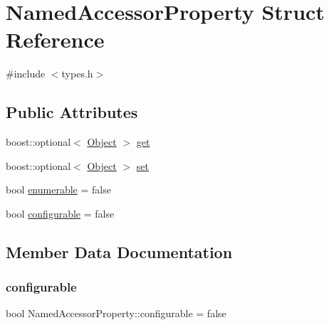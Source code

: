 \hypertarget{struct_named_accessor_property}{}\section{Named\+Accessor\+Property Struct Reference}
\label{struct_named_accessor_property}


{\ttfamily \#include $<$types.\+h$>$}

\subsection*{Public Attributes}
\begin{DoxyCompactItemize}
\item 
boost\+::optional$<$ \hyperlink{types_8h_a9ce4f5d96fcce7461a1917b47f7582dc}{Object} $>$ \hyperlink{struct_named_accessor_property_a2d4078ef1e87e5f0507507922c6fed40}{get}
\item 
boost\+::optional$<$ \hyperlink{types_8h_a9ce4f5d96fcce7461a1917b47f7582dc}{Object} $>$ \hyperlink{struct_named_accessor_property_a6716b808245f1325df646d3e653e197e}{set}
\item 
bool \hyperlink{struct_named_accessor_property_aaf709694d797fdd2d7a37c1662ed5acf}{enumerable} = false
\item 
bool \hyperlink{struct_named_accessor_property_ac41371f76afc8a2dfb48c4ca52b50da9}{configurable} = false
\end{DoxyCompactItemize}


\subsection{Member Data Documentation}
\mbox{\label{struct_named_accessor_property_ac41371f76afc8a2dfb48c4ca52b50da9}} 
\subsubsection{\texorpdfstring{configurable}{configurable}}
{\footnotesize\ttfamily bool Named\+Accessor\+Property\+::configurable = false}

\mbox{\label{struct_named_accessor_property_aaf709694d797fdd2d7a37c1662ed5acf}} 
